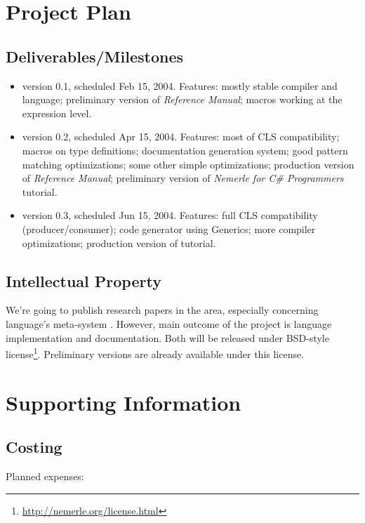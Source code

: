 \documentclass[a4paper,11pt]{article}
\begin{document}
\section{Project Plan}

\subsection{Deliverables/Milestones}
\begin{itemize}
\item version 0.1, scheduled Feb 15, 2004. Features:
  mostly stable compiler and language;
  preliminary version of \textit{Reference Manual}; 
  macros working at the expression level.

\item version 0.2, scheduled Apr 15, 2004. Features:
  most of CLS compatibility;
  macros on type definitions;
  documentation generation system;
  good pattern matching optimizations;
  some other simple optimizations;
  production version of \textit{Reference Manual};
  preliminary version of \textit{Nemerle for C\# Programmers} tutorial.
  
\item version 0.3, scheduled Jun 15, 2004. Features:
  full CLS compatibility (producer/consumer);
  code generator using Generics;
  more compiler optimizations;
  production version of tutorial.
\end{itemize}


\subsection{Intellectual Property}

We're going to publish research papers in the area, especially concerning
language's meta-system \cite{Macros}. However, main outcome of the project
is language implementation and documentation. Both will be released
under BSD-style license\footnote{\url{http://nemerle.org/license.html}}.
Preliminary versions are already available under this license.


\section{Supporting Information}


\subsection{Costing}

Planned expenses:
\end{document}
